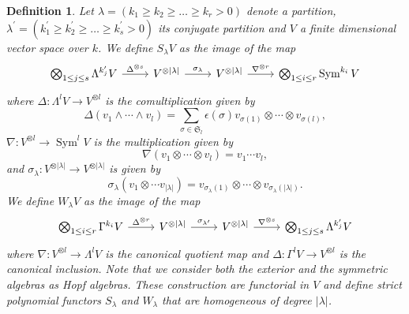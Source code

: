\documentclass[11pt]{amsart}
\numberwithin{subsection}{section}
\numberwithin{figure}{section}
\numberwithin{table}{section}
\theoremstyle{1}
\newtheorem{definition}[theorem]{Definition}
\theoremstyle{2}
\DeclareMathOperator{\Sym}{Sym}
\begin{document}
\begin{definition}
Let $\lambda = (k_1 \geq k_2 \geq \hdots \geq k_r > 0)$ denote a partition, $\lambda^\prime = (k^\prime_1 \geq k_2^\prime \geq \hdots \geq k_s^\prime > 0)$ its conjugate partition and $V$ a finite dimensional vector space over $k$. We define $S_\lambda V$ as the image of the map
\begin{equation*}
\begin{tikzcd}
\bigotimes_{1 \leq j \leq s} \Lambda^{k_j^\prime} {V} \arrow[r,"\Delta^{\otimes s}"] & {V}^{\otimes |\lambda |} \arrow[r,"\sigma_{\lambda}"] & {V}^{\otimes |\lambda |} \arrow[r,"\nabla^{\otimes r}"] & \bigotimes_{1 \leq i \leq r} \Sym^{k_i} V
\end{tikzcd}
\end{equation*}
where $\Delta : \Lambda^l{V} \rightarrow {V}^{\otimes l}$ is the comultiplication given by
\begin{equation*}
\Delta(v_1\wedge \cdots \wedge v_l) = \sum_{\sigma \in \mathfrak{S}_l}\epsilon(\sigma)v_{\sigma(1)}\otimes \cdots \otimes v_{\sigma(l)},
\end{equation*}
$\nabla :  {V}^{\otimes l} \rightarrow \Sym^l {V}$ is the multiplication given by 
\begin{equation*}
\nabla(v_1\otimes \cdots \otimes v_l) = v_1 \cdots v_l,
\end{equation*}
and $\sigma_\lambda : {V}^{\otimes |\lambda |} \rightarrow {V}^{\otimes |\lambda |}$ is given by
\begin{equation*}
\sigma_\lambda(v_1\otimes \cdots v_{|\lambda |}) = v_{\sigma_\lambda(1)}\otimes \cdots \otimes v_{\sigma_\lambda(|\lambda |)}.
\end{equation*}
We define $W_\lambda {V}$ as the image of the map
\begin{equation*}
\begin{tikzcd}
\bigotimes_{1 \leq i \leq r} \Gamma^{k_i} {V}  \arrow[r,"\Delta^{\otimes r}"] & {V}^{\otimes |\lambda |} \arrow[r,"\sigma_{\lambda^\prime}"] & {V}^{\otimes |\lambda |} \arrow[r,"\nabla^{\otimes s}"] & \bigotimes_{1 \leq j \leq s} \Lambda^{k^\prime_j} {V}
\end{tikzcd}
\end{equation*}
where $\nabla : {V}^{\otimes l} \rightarrow \Lambda^l{V}$ is the canonical quotient map and $\Delta : \Gamma^{l}{V} \rightarrow {V}^{\otimes l}$ is the canonical inclusion. Note that we consider both the exterior and the symmetric algebras as Hopf algebras. These construction are functorial in $V$ and define strict polynomial functors $S_\lambda$ and $W_\lambda$ that are homogeneous of degree $|\lambda |$.
\end{definition}
\end{document}
